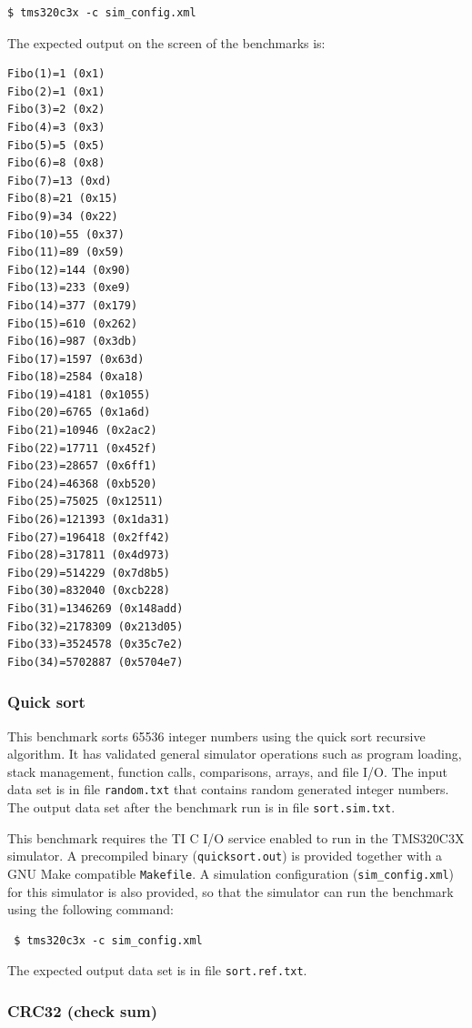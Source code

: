 \begin{verbatim}
$ tms320c3x -c sim_config.xml
\end{verbatim}

\noindent The expected output on the screen of the benchmarks is:

\begin{verbatim}
Fibo(1)=1 (0x1)
Fibo(2)=1 (0x1)
Fibo(3)=2 (0x2)
Fibo(4)=3 (0x3)
Fibo(5)=5 (0x5)
Fibo(6)=8 (0x8)
Fibo(7)=13 (0xd)
Fibo(8)=21 (0x15)
Fibo(9)=34 (0x22)
Fibo(10)=55 (0x37)
Fibo(11)=89 (0x59)
Fibo(12)=144 (0x90)
Fibo(13)=233 (0xe9)
Fibo(14)=377 (0x179)
Fibo(15)=610 (0x262)
Fibo(16)=987 (0x3db)
Fibo(17)=1597 (0x63d)
Fibo(18)=2584 (0xa18)
Fibo(19)=4181 (0x1055)
Fibo(20)=6765 (0x1a6d)
Fibo(21)=10946 (0x2ac2)
Fibo(22)=17711 (0x452f)
Fibo(23)=28657 (0x6ff1)
Fibo(24)=46368 (0xb520)
Fibo(25)=75025 (0x12511)
Fibo(26)=121393 (0x1da31)
Fibo(27)=196418 (0x2ff42)
Fibo(28)=317811 (0x4d973)
Fibo(29)=514229 (0x7d8b5)
Fibo(30)=832040 (0xcb228)
Fibo(31)=1346269 (0x148add)
Fibo(32)=2178309 (0x213d05)
Fibo(33)=3524578 (0x35c7e2)
Fibo(34)=5702887 (0x5704e7)
\end{verbatim}

\subsubsection{Quick sort}

This benchmark sorts 65536 integer numbers using the quick sort recursive algorithm.
It has validated general simulator operations such as program loading, stack management, function calls, comparisons, arrays, and file I/O.
The input data set is in file \texttt{random.txt} that contains random generated integer numbers.
The output data set after the benchmark run is in file \texttt{sort.sim.txt}.

This benchmark requires the TI C I/O service enabled to run in the TMS320C3X simulator.
A precompiled binary (\texttt{quicksort.out}) is provided together with a GNU Make compatible \texttt{Makefile}.
A simulation configuration (\texttt{sim\_config.xml}) for this simulator is also provided, so that the simulator can run the benchmark using the following command:

\begin{verbatim}
 $ tms320c3x -c sim_config.xml
\end{verbatim}

\noindent The expected output data set is in file \texttt{sort.ref.txt}.

\subsubsection{CRC32 (check sum)}

